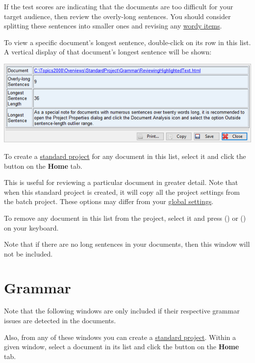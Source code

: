 \documentclass[
]{book}
\theoremstyle{definition}
\theoremstyle{definition}
\theoremstyle{definition}
\theoremstyle{definition}
\theoremstyle{remark}
\begin{document}
If the test scores are indicating that the documents are too difficult for your target audience, then review the overly-long sentences. You should consider splitting these sentences into smaller ones and revising any \protect\hyperlink{reviewing-batch-wordiness}{wordy items}.

To view a specific document's longest sentence, double-click on its row in this list. A vertical display of that document's longest sentence will be shown:

\includegraphics{Images/batchlongestsentenceviewitem.png}

To create a \protect\hyperlink{creating-standard-project}{standard project} for any document in this list, select it and click the  button on the \textbf{Home} tab.

This is useful for reviewing a particular document in greater detail. Note that when this standard project is created, it will copy all the project settings from the batch project. These options may differ from your \protect\hyperlink{options-overview}{global settings}.

To remove any document in this list from the project, select it and press  (\faWindows) or \keys{\backdel} (\faApple) on your keyboard.

Note that if there are no long sentences in your documents, then this window will not be included.

\hypertarget{reviewing-batch-grammar}{%
\section{Grammar}\label{reviewing-batch-grammar}}

Note that the following windows are only included if their respective grammar issues are detected in the documents.

Also, from any of these windows you can create a \protect\hyperlink{creating-standard-project}{standard project}. Within a given window, select a document in its list and click the  button on the \textbf{Home} tab.
\end{document}
